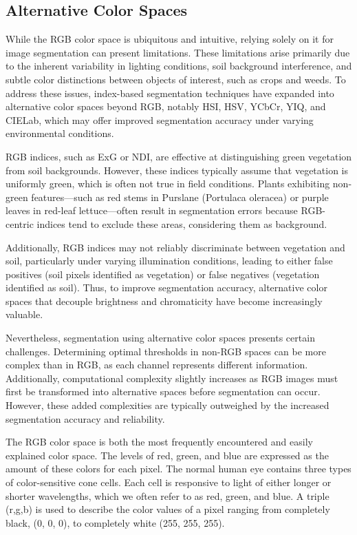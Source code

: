 \documentclass[letterpaper, notitlepage]{report}
\begin{document}
{\subsection{Alternative Color Spaces}
While the RGB color space is ubiquitous and intuitive, relying solely on it for image segmentation can present limitations. These limitations arise primarily due to the inherent variability in lighting conditions, soil background interference, and subtle color distinctions between objects of interest, such as crops and weeds. To address these issues, index-based segmentation techniques have expanded into alternative color spaces beyond RGB, notably \gls{HSI}, \gls{HSV}, YCbCr, YIQ, and CIELab, which may offer improved segmentation accuracy under varying environmental conditions.

RGB indices, such as \gls{ExG} or \gls{NDI}, are effective at distinguishing green vegetation from soil backgrounds. However, these indices typically assume that vegetation is uniformly green, which is often not true in field conditions. Plants exhibiting non-green features—such as red stems in Purslane (Portulaca oleracea) or purple leaves in red-leaf lettuce—often result in segmentation errors because RGB-centric indices tend to exclude these areas, considering them as background.

Additionally, RGB indices may not reliably discriminate between vegetation and soil, particularly under varying illumination conditions, leading to either false positives (soil pixels identified as vegetation) or false negatives (vegetation identified as soil). Thus, to improve segmentation accuracy, alternative color spaces that decouple brightness and chromaticity have become increasingly valuable.

Nevertheless, segmentation using alternative color spaces presents certain challenges. Determining optimal thresholds in non-RGB spaces can be more complex than in RGB, as each channel represents different information. Additionally, computational complexity slightly increases as RGB images must first be transformed into alternative spaces before segmentation can occur. However, these added complexities are typically outweighed by the increased segmentation accuracy and reliability.

The RGB color space is both the most frequently encountered and easily explained color space. The levels of red, green, and blue are expressed as the amount of these colors for each pixel. The normal human eye contains three types of color-sensitive cone cells. Each cell is responsive to light of either longer or shorter wavelengths, which we often refer to as red, green, and blue. A triple (r,g,b) is used to describe the color values of a pixel ranging from completely black, (0, 0, 0), to completely white (255, 255, 255).

}
\end{document}
